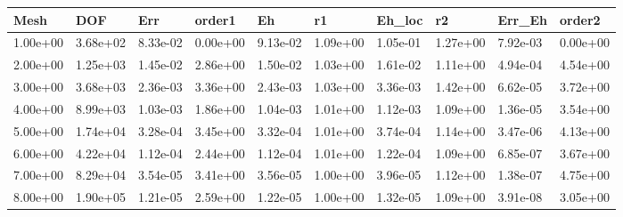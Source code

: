 \begin{tabular}{llllllllll}
Mesh & DOF & Err & order1 & Eh & r1 & Eh_loc & r2 & Err_Eh & order2 \\ 
\hline 
1.00e+00 & 3.68e+02 & 8.33e-02 & 0.00e+00 & 9.13e-02 & 1.09e+00 & 1.05e-01 & 1.27e+00 & 7.92e-03 & 0.00e+00 \\ 
2.00e+00 & 1.25e+03 & 1.45e-02 & 2.86e+00 & 1.50e-02 & 1.03e+00 & 1.61e-02 & 1.11e+00 & 4.94e-04 & 4.54e+00 \\ 
3.00e+00 & 3.68e+03 & 2.36e-03 & 3.36e+00 & 2.43e-03 & 1.03e+00 & 3.36e-03 & 1.42e+00 & 6.62e-05 & 3.72e+00 \\ 
4.00e+00 & 8.99e+03 & 1.03e-03 & 1.86e+00 & 1.04e-03 & 1.01e+00 & 1.12e-03 & 1.09e+00 & 1.36e-05 & 3.54e+00 \\ 
5.00e+00 & 1.74e+04 & 3.28e-04 & 3.45e+00 & 3.32e-04 & 1.01e+00 & 3.74e-04 & 1.14e+00 & 3.47e-06 & 4.13e+00 \\ 
6.00e+00 & 4.22e+04 & 1.12e-04 & 2.44e+00 & 1.12e-04 & 1.01e+00 & 1.22e-04 & 1.09e+00 & 6.85e-07 & 3.67e+00 \\ 
7.00e+00 & 8.29e+04 & 3.54e-05 & 3.41e+00 & 3.56e-05 & 1.00e+00 & 3.96e-05 & 1.12e+00 & 1.38e-07 & 4.75e+00 \\ 
8.00e+00 & 1.90e+05 & 1.21e-05 & 2.59e+00 & 1.22e-05 & 1.00e+00 & 1.32e-05 & 1.09e+00 & 3.91e-08 & 3.05e+00 \\ 
\hline 
\end{tabular}